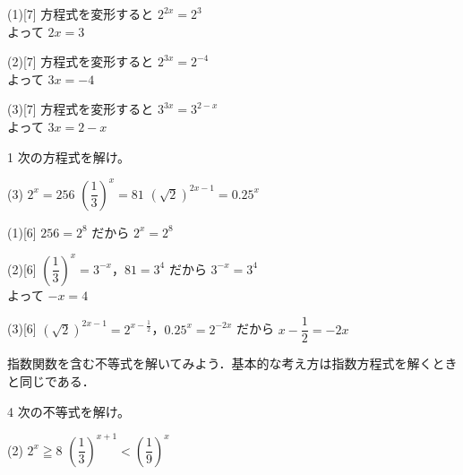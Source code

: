 \documentclass[14pt,dvipdfmx]{jsarticle}
\begin{document}
\begin{answerbox}{(1)}[7]
  方程式を変形すると $2^{2x}=2^3$\\
  よって $2x=3$
\end{answerbox}
\begin{answerbox}{(2)}[7]
  方程式を変形すると $2^{3x}=2^{-4}$\\
  よって $3x=-4$
\end{answerbox}
\begin{answerbox}{(3)}[7]
  方程式を変形すると $3^{3x}=3^{2-x}$\\
  よって $3x=2-x$
\end{answerbox}
\vspace{0.5em}

\begin{exerciseprob}{1}
  次の方程式を解け。
  \begin{tasks}[label=(\arabic*), label-width=1.6zw, item-indent=2zw, after-item-skip=0.15em](3)
    \task $2^x = 256$
    \task $\left(\dfrac{1}{3}\right)^x = 81$
    \task $(\sqrt{2})^{2x-1} = 0.25^x$
  \end{tasks}
\end{exerciseprob}

\begin{answerbox}{(1)}[6]
  $256=2^8$ だから $2^x=2^8$ \\
\end{answerbox}
\begin{answerbox}{(2)}[6]
  $\left(\dfrac{1}{3}\right)^x=3^{-x}$，$81=3^4$ だから $3^{-x}=3^4$ \\
  よって $-x=4$
\end{answerbox}
\begin{answerbox}{(3)}[6]
  $(\sqrt{2})^{2x-1}=2^{x-\frac{1}{2}}$，$0.25^x=2^{-2x}$ だから $x-\dfrac{1}{2}=-2x$ \\
\end{answerbox}

\vfill
\nextpage

指数関数を含む不等式を解いてみよう．基本的な考え方は指数方程式を解くときと同じである．

\begin{exampleprob}{4}
  次の不等式を解け。
  \begin{tasks}[label=(\arabic*), label-width=1.6zw, item-indent=2zw, after-item-skip=0.15em](2)
    \task $2^x \geqq 8$
    \task $\left(\dfrac{1}{3}\right)^{x+1} < \left(\dfrac{1}{9}\right)^x$
  \end{tasks}
\end{exampleprob}
\end{document}
